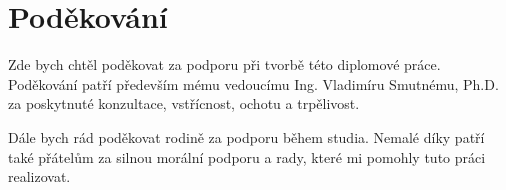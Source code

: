 \null 
\section*{Poděkování}

Zde bych chtěl poděkovat za podporu při tvorbě této diplomové práce. Poděkování patří především mému vedoucímu Ing. Vladimíru Smutnému, Ph.D. za poskytnuté konzultace, vstřícnost, ochotu a trpělivost. 

Dále bych rád poděkovat rodině za podporu během studia. Nemalé díky patří také přátelům za silnou morální podporu a rady, které mi pomohly tuto práci realizovat.   

\vfill{}